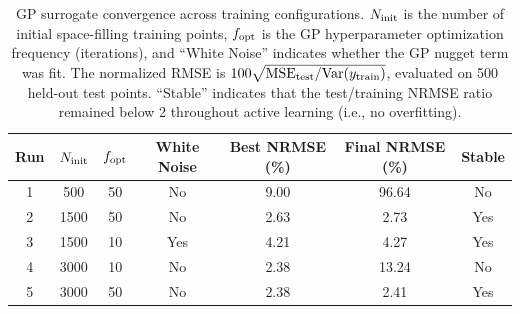 \begin{table}
\centering
\caption{GP surrogate convergence across training configurations. $N_{\rm init}$
is the number of initial space-filling training points, $f_{\rm opt}$ is the GP
hyperparameter optimization frequency (iterations), and ``White Noise'' indicates
whether the GP nugget term was fit. The normalized RMSE is
$100\sqrt{{\rm MSE}_{\rm test}/{\rm Var}(y_{\rm train})}$, evaluated on 500
held-out test points. ``Stable'' indicates that the test/training NRMSE ratio
remained below 2 throughout active learning (i.e., no overfitting).}
\label{tab:convergence}
\begin{tabular}{ccccccc}
\hline
Run & $N_{\rm init}$ & $f_{\rm opt}$ & White Noise & Best NRMSE (\%) & Final NRMSE (\%) & Stable \\
\hline
1 & 500  & 50 & No  &  9.00 & 96.64 & No  \\
2 & 1500 & 50 & No  &  2.63 &  2.73 & Yes \\
3 & 1500 & 10 & Yes &  4.21 &  4.27 & Yes \\
4 & 3000 & 10 & No  &  2.38 & 13.24 & No  \\
5 & 3000 & 50 & No  &  2.38 &  2.41 & Yes \\
\hline
\end{tabular}
\end{table}
